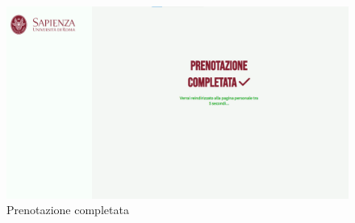 \documentclass [a4paper, 12pt]{book}
\begin{document}
\begin{figure}[!h]
\centering
\includegraphics[scale=0.26]{PrenotazioneCompletata.png}
\caption{Prenotazione completata}
\label{PrenotazioneCompletata}
\end{figure}
\end{document}

